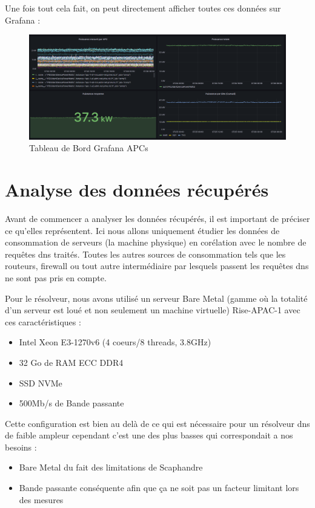 
Une fois tout cela fait, on peut directement afficher toutes ces données sur Grafana :
\begin{figure}[htbp]
  \centering
  \includegraphics[width=\textwidth]{paper/figures/GrafanaAPC.png}
  \caption{Tableau de Bord Grafana APCs}
  \label{fig:GrafanaAPC}
\end{figure}

\section{Analyse des données récupérés}

Avant de commencer a analyser les données récupérés, il est important de préciser ce qu'elles représentent.
Ici nous allons uniquement étudier les données de consommation de serveurs (la machine physique) en corélation avec le nombre de requêtes dns traités.
Toutes les autres sources de consommation tels que les routeurs, firewall ou tout autre intermédiaire par lesquels passent les requêtes dns ne sont pas pris en compte.

Pour le résolveur, nous avons utilisé un serveur Bare Metal (gamme où la totalité d'un serveur est loué et non seulement un machine virtuelle) Rise-APAC-1  avec ces caractéristiques :
\begin{itemize}
    \item Intel Xeon E3-1270v6 (4 coeurs/8 threads, 3.8GHz)
    \item 32 Go de RAM ECC DDR4
    \item SSD NVMe
    \item 500Mb/s de Bande passante
\end{itemize}

Cette configuration est bien au delà de ce qui est nécessaire pour un résolveur dns de faible ampleur cependant c'est une des plus basses qui correspondait a nos besoins :
\begin{itemize}
    \item Bare Metal du fait des limitations de Scaphandre
    \item Bande passante conséquente afin que ça ne soit pas un facteur limitant lors des mesures
\end{itemize}



